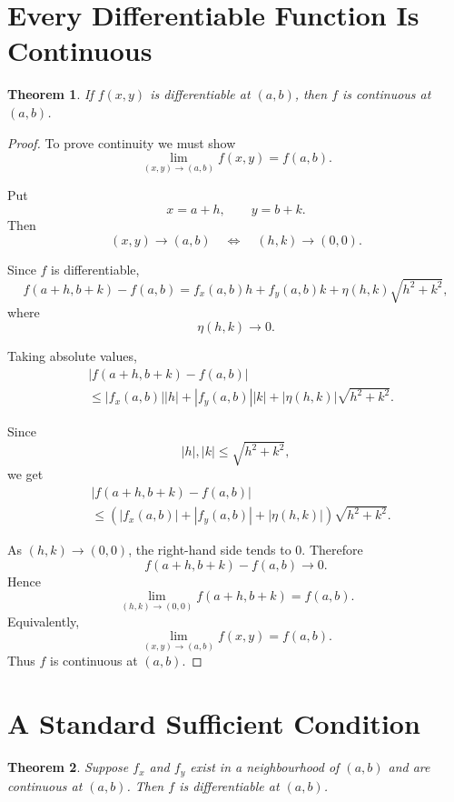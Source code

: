 \documentclass[11pt,oneside]{book}
\theoremstyle{studentthm}
\newtheorem{theorem}{Theorem}[chapter]
\theoremstyle{definition}
\newcommand{\abs}[1]{\left|#1\right|}
\begin{document}
\section{Every Differentiable Function Is Continuous}

\begin{theorem}
If \(f(x,y)\) is differentiable at \((a,b)\), then \(f\) is
continuous at \((a,b)\).
\end{theorem}

\begin{proof}
To prove continuity we must show
\[
\lim_{(x,y)\to(a,b)}f(x,y)=f(a,b).
\]

Put
\[
x=a+h,\qquad y=b+k.
\]
Then
\[
(x,y)\to(a,b)
\quad\Longleftrightarrow\quad
(h,k)\to(0,0).
\]

Since \(f\) is differentiable,
\[
f(a+h,b+k)-f(a,b)
=
f_x(a,b)h
+
f_y(a,b)k
+
\eta(h,k)\sqrt{h^2+k^2},
\]
where
\[
\eta(h,k)\to0.
\]

Taking absolute values,
\[
\begin{aligned}
&
\abs{f(a+h,b+k)-f(a,b)}
\\
&\le
\abs{f_x(a,b)}\abs h
+
\abs{f_y(a,b)}\abs k
+
\abs{\eta(h,k)}\sqrt{h^2+k^2}.
\end{aligned}
\]

Since
\[
\abs h,\abs k\le\sqrt{h^2+k^2},
\]
we get
\[
\begin{aligned}
&
\abs{f(a+h,b+k)-f(a,b)}
\\
&\le
\left(
\abs{f_x(a,b)}
+\abs{f_y(a,b)}
+\abs{\eta(h,k)}
\right)
\sqrt{h^2+k^2}.
\end{aligned}
\]

As \((h,k)\to(0,0)\), the right-hand side tends to \(0\).
Therefore
\[
f(a+h,b+k)-f(a,b)\to0.
\]
Hence
\[
\lim_{(h,k)\to(0,0)}f(a+h,b+k)=f(a,b).
\]
Equivalently,
\[
\lim_{(x,y)\to(a,b)}f(x,y)=f(a,b).
\]
Thus \(f\) is continuous at \((a,b)\).
\end{proof}

\section{A Standard Sufficient Condition}

\begin{theorem}
Suppose \(f_x\) and \(f_y\) exist in a neighbourhood of \((a,b)\)
and are continuous at \((a,b)\). Then \(f\) is differentiable at
\((a,b)\).
\end{theorem}
\end{document}

